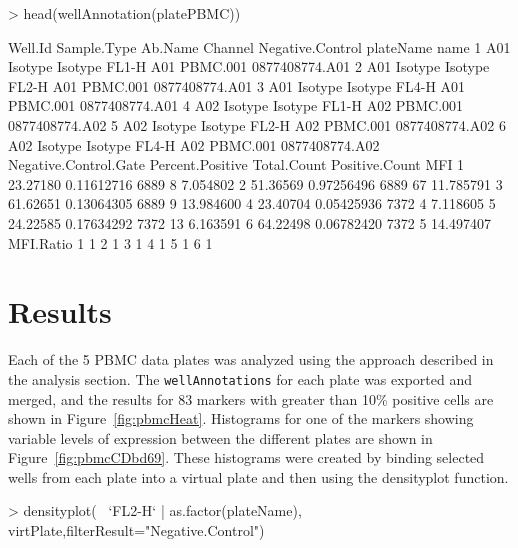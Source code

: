 \documentclass[12pt]{article}
\newcommand{\Robject}[1]{{\texttt{#1}}}
\begin{document}
\begin{Schunk}
\begin{Sinput}
> head(wellAnnotation(platePBMC))
\end{Sinput}
\begin{Soutput}
  Well.Id Sample.Type Ab.Name Channel Negative.Control plateName           name
1     A01     Isotype Isotype   FL1-H              A01  PBMC.001 0877408774.A01
2     A01     Isotype Isotype   FL2-H              A01  PBMC.001 0877408774.A01
3     A01     Isotype Isotype   FL4-H              A01  PBMC.001 0877408774.A01
4     A02     Isotype Isotype   FL1-H              A02  PBMC.001 0877408774.A02
5     A02     Isotype Isotype   FL2-H              A02  PBMC.001 0877408774.A02
6     A02     Isotype Isotype   FL4-H              A02  PBMC.001 0877408774.A02
  Negative.Control.Gate Percent.Positive Total.Count Positive.Count       MFI
1              23.27180       0.11612716        6889              8  7.054802
2              51.36569       0.97256496        6889             67 11.785791
3              61.62651       0.13064305        6889              9 13.984600
4              23.40704       0.05425936        7372              4  7.118605
5              24.22585       0.17634292        7372             13  6.163591
6              64.22498       0.06782420        7372              5 14.497407
  MFI.Ratio
1         1
2         1
3         1
4         1
5         1
6         1
\end{Soutput}
\end{Schunk}




\clearpage
\section{Results}

Each of the 5 PBMC data plates was analyzed using the approach described in the analysis section.  The \Robject{wellAnnotations}
for each plate was exported and merged, and the results for 83 markers with greater than 10\% positive cells are shown in Figure~\ref{fig:pbmcHeat}.
Histograms for one of the markers showing variable levels of expression between the different plates are shown in Figure~\ref{fig:pbmcCDbd69}. 
These histograms were created by binding selected wells from each plate into a virtual plate and then using
the densityplot function.
\begin{Schunk}
\begin{Sinput}
> densityplot(~ `FL2-H` | as.factor(plateName), virtPlate,filterResult="Negative.Control")
\end{Sinput}
\end{Schunk}
\end{document}

